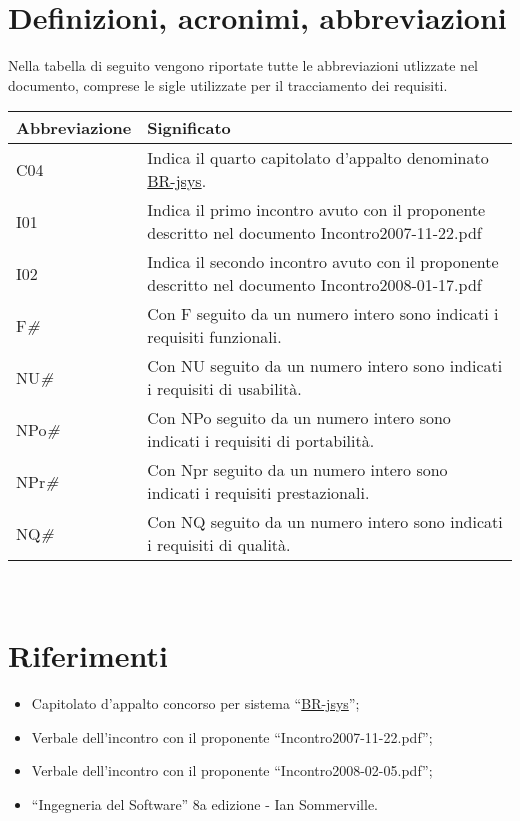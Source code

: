 \section{Definizioni, acronimi, abbreviazioni}
Nella tabella di seguito vengono riportate tutte le abbreviazioni utlizzate nel documento, comprese le sigle utilizzate per il tracciamento dei requisiti.
\begin{center}
\begin{tabular}{||p{3.0cm}||p{8.5cm}||} \hline
\textbf{Abbreviazione} & \textbf{Significato} \\ \hline
C04 & Indica il quarto capitolato d'appalto denominato \underline{BR-jsys}.\\ \hline
I01 & Indica il primo incontro avuto con il proponente descritto nel documento Incontro2007-11-22.pdf\\ \hline
I02 & Indica il secondo incontro avuto con il proponente descritto nel documento Incontro2008-01-17.pdf\\ \hline
F\textit{\#} & Con F seguito da un numero intero sono indicati i requisiti funzionali.\\ \hline
NU\textit{\#} & Con NU seguito da un numero intero sono indicati i requisiti di usabilit\`a.\\ \hline
NPo\textit{\#} & Con NPo seguito da un numero intero sono indicati i requisiti di portabilit\`a.\\ \hline
NPr\textit{\#} & Con Npr seguito da un numero intero sono indicati i requisiti prestazionali.\\ \hline
NQ\textit{\#} & Con NQ seguito da un numero intero sono indicati i requisiti di qualit\`a.\\ \hline

\end{tabular} \\
\end{center}

\section{Riferimenti}
\begin{itemize}
\item Capitolato d'appalto concorso per sistema ``\underline{BR-jsys}'';
\item Verbale dell'incontro con il proponente ``Incontro2007-11-22.pdf'';
\item Verbale dell'incontro con il proponente ``Incontro2008-02-05.pdf'';
\item ``Ingegneria del Software'' 8a edizione - Ian Sommerville.
\end{itemize}
